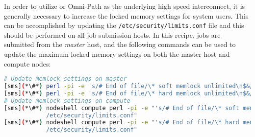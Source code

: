In order to utilize \InfiniBand{} or Omni-Path as the underlying high speed interconnect, it is
generally necessary to increase the locked memory settings for system
users. This can be accomplished by updating
the \texttt{/etc/security/limits.conf} file and this should be performed
on all job submission hosts. In this recipe, jobs
are submitted from the {\em master} host, and the following commands can be
used to update the maximum locked memory settings on both the master host and
compute nodes:

\begin{lstlisting}[language=bash,keywords={},upquote=true]
# Update memlock settings on master
[sms](*\#*) perl -pi -e 's/# End of file/\* soft memlock unlimited\n$&/s' /etc/security/limits.conf
[sms](*\#*) perl -pi -e 's/# End of file/\* hard memlock unlimited\n$&/s' /etc/security/limits.conf
# Update memlock settings on compute
[sms](*\#*) nodeshell compute perl -pi -e "'s/# End of file/\* soft memlock unlimited\n$&/s' \
            /etc/security/limits.conf"
[sms](*\#*) nodeshell compute perl -pi -e "'s/# End of file/\* hard memlock unlimited\n$&/s' \
            /etc/security/limits.conf"
\end{lstlisting}
